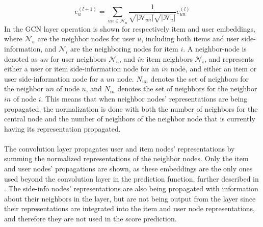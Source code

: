 \begin{equation}\label{eq:csgcn_is_gc_layer_user}
     e_{u}^{(l+1)}=\sum_{un\in \mathcal{N}_{u}}\frac{1}{\sqrt{|\mathcal{N}_{un}|} \sqrt{|\mathcal{N}_{u}|}}e_{un}^{(l)}
\end{equation}
In  the GCN layer operation is shown for respectively item and user embeddings, where $\mathcal{N}_{u}$ are the neighbor nodes for user $u$, including both items and user side-information, and $\mathcal{N}_{i}$ are the neighboring nodes for item $i$. 
A neighbor-node is denoted as $un$ for user neighbors $\mathcal{N}_{u}$, and $in$ item neighbors $\mathcal{N}_{i}$, and represents either a user or item side-information node for an $in$ node, and either an item or user side-information node for a $un$ node.
$N_{un}$ denotes the set of neighbors for the neighbor $un$ of node $u$, and $N_{in}$ denotes the set of neighbors for the neighbor $in$ of node $i$.
This means that when neighbor nodes' representations are being propagated, the normalization is done with both the number of neighbors for the central node and the number of neighbors of the neighbor node that is currently having its representation propagated.
\\\\
The convolution layer propagates user and item nodes' representations by summing the normalized representations of the neighbor nodes.
Only the item and user nodes' propagations are shown, as these embeddings are the only ones used beyond the convolution layer in the prediction function, further described in .
The side-info nodes' representations are also being propagated with information about their neighbors in the layer, but are not being output from the layer since their representations are integrated into the item and user node representations, and therefore they are not used in the score prediction.

